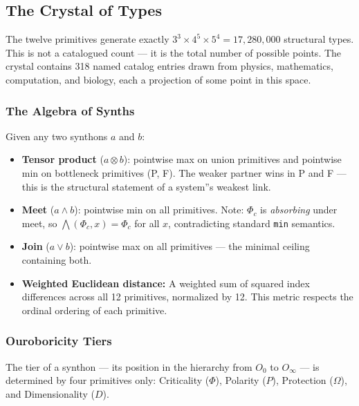 \documentclass[12pt,a4paper]{article}
\begin{document}
\subsection{The Crystal of Types}

The twelve primitives generate exactly $3^3 \times 4^5 \times 5^4 = 17{,}280{,}000$ structural types. This is not a catalogued count --- it is the total number of possible points. The crystal contains 318 named catalog entries drawn from physics, mathematics, computation, and biology, each a projection of some point in this space.

\subsubsection{The Algebra of Synths}

Given any two synthons $a$ and $b$:

\begin{itemize}
    \item \textbf{Tensor product} ($a \otimes b$): pointwise max on union primitives and pointwise min on bottleneck primitives (P, F). The weaker partner wins in P and F --- this is the structural statement of a system''s weakest link.
    \item \textbf{Meet} ($a \wedge b$): pointwise min on all primitives. Note: $\Phi_c$ is \emph{absorbing} under meet, so $\bigwedge(\Phi_c, x) = \Phi_c$ for all $x$, contradicting standard \texttt{min} semantics.
    \item \textbf{Join} ($a \vee b$): pointwise max on all primitives --- the minimal ceiling containing both.
    \item \textbf{Weighted Euclidean distance:} A weighted sum of squared index differences across all 12 primitives, normalized by 12. This metric respects the ordinal ordering of each primitive.
\end{itemize}

\subsubsection{Ouroboricity Tiers}

The tier of a synthon --- its position in the hierarchy from $O_0$ to $O_{\infty}$ --- is determined by four primitives only: Criticality ($\Phi$), Polarity ($P$), Protection ($\Omega$), and Dimensionality ($D$).
\end{document}
